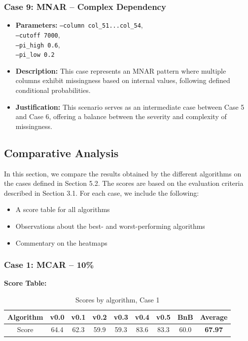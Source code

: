 \documentclass[a4paper,12pt]{article}
\begin{document}
\subsubsection{Case 9: MNAR – Complex Dependency}
\begin{itemize}
    \item \textbf{Parameters:} \texttt{--column col\_51...col\_54},\\
    \texttt{--cutoff 7000},\\
    \texttt{--pi\_high 0.6},\\
    \texttt{--pi\_low 0.2}
    
    \item \textbf{Description:} This case represents an MNAR pattern where multiple columns exhibit missingness based on internal values, following defined conditional probabilities.
    
    \item \textbf{Justification:} This scenario serves as an intermediate case between Case 5 and Case 6, offering a balance between the severity and complexity of missingness.
\end{itemize}


\subsection{Comparative Analysis}
In this section, we compare the results obtained by the different algorithms on the cases defined in Section 5.2. The scores are based on the evaluation criteria described in Section 3.1. For each case, we include the following:

\begin{itemize}
    \item A score table for all algorithms
    \item Observations about the best- and worst-performing algorithms
    \item Commentary on the heatmaps
\end{itemize}

\subsubsection{Case 1: MCAR – 10\%}

\textbf{Score Table:}

\begin{table}[h]
\centering
\caption{Scores by algorithm, Case 1}
\label{tab:score_algorithms_case1}
\begin{tabular}{|c|c|c|c|c|c|c|c|c|}
\hline
Algorithm & v0.0 & v0.1 & v0.2 & v0.3 & v0.4 & v0.5 & BnB & Average \\
\hline
Score & 64.4 & 62.3 & 59.9 & 59.3 & 83.6 & 83.3 & 60.0 & \textbf{67.97} \\
\hline
\end{tabular}
\end{table}
\end{document}
